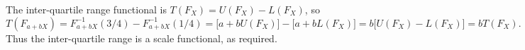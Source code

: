 \begin{exercise}
\begin{questions}
\begin{parts}
\begin{answer}
\bigskip
The inter-quartile range functional is $T(F_X)=U(F_X)-L(F_X)$, so
\[
T(F_{a+bX}) 
	= F_{a+bX}^{-1}(3/4) - F_{a+bX}^{-1}(1/4) 
	= \big[a+bU(F_X)\big] - \big[a + bL(F_X)\big]
	= b\big[U(F_X)-L(F_X)\big]
	= bT(F_X).
\]
Thus the inter-quartile range is a scale functional, as required.
\end{answer}
\end{parts}
\end{questions}
\end{exercise}


